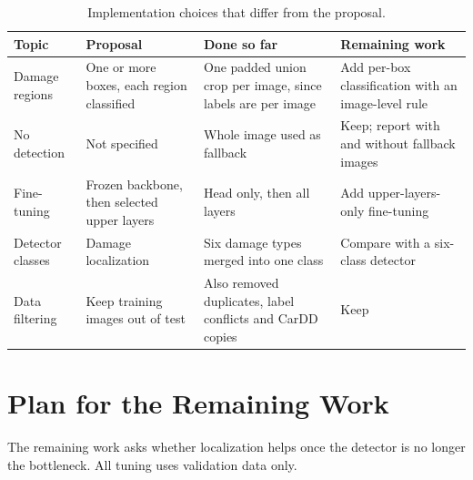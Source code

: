 \documentclass[11pt]{article}
\begin{document}
\begin{table}[!htbp]
\centering
\caption{Implementation choices that differ from the proposal.}
\label{tab:dev}
\small
\begin{tabularx}{\textwidth}{@{}p{2.3cm} L L L@{}}
\toprule
Topic & Proposal & Done so far & Remaining work \\
\midrule
Damage regions & One or more boxes, each region classified & One padded union crop per image, since labels are per image & Add per-box classification with an image-level rule \\
No detection & Not specified & Whole image used as fallback & Keep; report with and without fallback images \\
Fine-tuning & Frozen backbone, then selected upper layers & Head only, then all layers & Add upper-layers-only fine-tuning \\
Detector classes & Damage localization & Six damage types merged into one class & Compare with a six-class detector \\
Data filtering & Keep training images out of test & Also removed duplicates, label conflicts and CarDD copies & Keep \\
\bottomrule
\end{tabularx}
\end{table}

\section{Plan for the Remaining Work}

The remaining work asks whether localization helps once the detector is no longer the bottleneck. All tuning uses validation data only.
\end{document}

